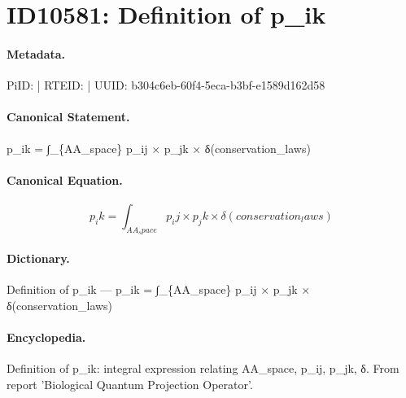 \section*{ID10581: Definition of p\_ik}
\paragraph{Metadata.}
PiID:  | RTEID:  | UUID: b304c6eb-60f4-5eca-b3bf-e1589d162d58

\paragraph{Canonical Statement.}
p\_ik = ∫\_\{AA\_space\} p\_ij × p\_jk × δ(conservation\_laws)

\paragraph{Canonical Equation.}
\[
p_ik = ∫_{AA_space} p_ij × p_jk × δ(conservation_laws)
\]

\paragraph{Dictionary.}
Definition of p\_ik — p\_ik = ∫\_\{AA\_space\} p\_ij × p\_jk × δ(conservation\_laws)

\paragraph{Encyclopedia.}
Definition of p\_ik: integral expression relating AA\_space, p\_ij, p\_jk, δ. From report 'Biological Quantum Projection Operator'.
